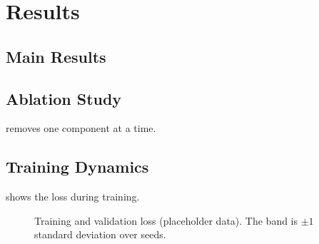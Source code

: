 \section{Results}\label{sec:results}

\subsection{Main Results}\label{sec:main-results}

\begin{table}[t]
  \centering
  \caption{Main results: mean $\pm$ standard deviation over 5 seeds; best in bold. \emph{Placeholder values}: generate this table from the results files (\texttt{latex-results-sync} skill).}
  \label{tab:main}
  
\end{table}


\subsection{Ablation Study}\label{sec:ablation}
 removes one component at a time.

\begin{table}[t]
  \centering
  \caption{Ablation on Dataset~1 (placeholder values). $\Delta$ is the change from the full model.}
  \label{tab:ablation}
  
\end{table}


\subsection{Training Dynamics}\label{sec:dynamics}
 shows the loss during training.

\begin{figure}[t]
  \centering
  
  \caption{Training and validation loss (placeholder data). The band is $\pm 1$ standard deviation over seeds.}
  \label{fig:curves}
\end{figure}

